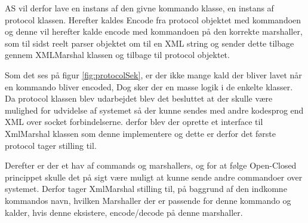 \gls{AS} vil derfor lave en instans af den givne kommando klasse, en instans af protocol klassen. Herefter kaldes Encode fra protocol objektet med kommandoen og denne vil herefter kalde encode med kommandoen på den korrekte marshaller, som til sidst reelt parser objektet om til en XML string og sender dette tilbage gennem XMLMarshal klassen og tilbage til protocol objektet. 

Som det ses på figur \ref{fig:protocolSek}, er der ikke mange kald der bliver lavet når en kommando bliver encoded, Dog sker der en masse logik i de enkelte klasser. Da protocol klassen blev udarbejdet blev det besluttet at der skulle være mulighed for udvidelse af systemet så der kunne sendes med andre kodesprog end XML over socket forbindelserne. derfor blev der oprette et interface til XmlMarshal klassen som denne implementere og dette er derfor det første protocol tager stilling til.

Derefter er der et hav af commands og marshallers, og for at følge Open-Closed princippet skulle det på sigt være muligt at kunne sende andre commandoer over systemet. Derfor tager XmlMarshal stilling til, på baggrund af den indkomne kommandos navn, hvilken Marshaller der er passende for denne kommando og kalder, hvis denne eksistere, encode/decode på denne marshaller.
